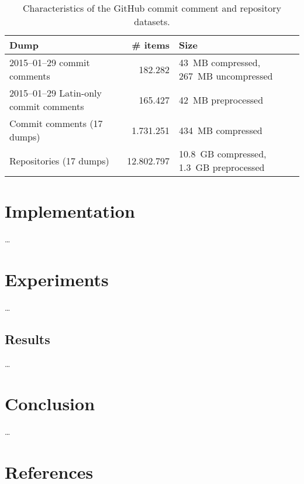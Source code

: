 \documentclass{article}
\begin{document}
\begin{table}[h]
  \centering
  \begin{tabular}{|l|r|l|}
    \hline
    \textbf{Dump}                           & \textbf{\# items} & \textbf{Size}                           \\ \hline
    2015--01--29 commit comments            & 182.282           & 43~MB compressed, 267~MB uncompressed   \\ \hline
    2015--01--29 Latin-only commit comments & 165.427           & 42~MB preprocessed                      \\ \hline
    Commit comments (17 dumps)              & 1.731.251         & 434~MB compressed                       \\ \hline
    Repositories (17 dumps)                 & 12.802.797        & 10.8~GB compressed, 1.3~GB preprocessed \\
    \hline
  \end{tabular}
  \caption{Characteristics of the GitHub commit comment and repository datasets.}
  \label{tab:dataset}
\end{table}

\section{Implementation}\label{sec:implementation}
\ldots

\section{Experiments}\label{sec:experiments}
\ldots

\subsection{Results}\label{sec:results}
\ldots

\section{Conclusion}\label{sec:conclusion}
\ldots

\section{References}\label{sec:references}
\printbibliography[heading=none]
\end{document}
